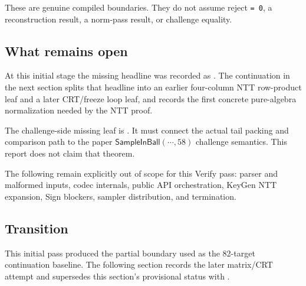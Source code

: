 These are genuine compiled boundaries. They do not assume reject
\texttt{= 0}, a reconstruction result, a norm-pass result, or challenge
equality.

\subsection*{What remains open}

At this initial stage the missing headline was recorded as
.  The continuation in
the next section splits that headline into an earlier four-column NTT
row-product leaf and a later CRT/freeze loop leaf, and records the first
concrete pure-algebra normalization needed by the NTT proof.

The challenge-side missing leaf is
. It must connect
the actual tail packing and comparison path to the paper
\(\mathsf{SampleInBall}(\cdots,58)\) challenge semantics. This report does not
claim that theorem.

The following remain explicitly out of scope for this Verify pass:
parser and malformed inputs, codec internals, public API orchestration,
KeyGen NTT expansion, Sign blockers, sampler distribution, and termination.

\subsection*{Transition}

This initial pass produced the partial boundary used as the 82-target
continuation baseline.  The following section records the later matrix/CRT
attempt and supersedes this section's provisional status with
.
